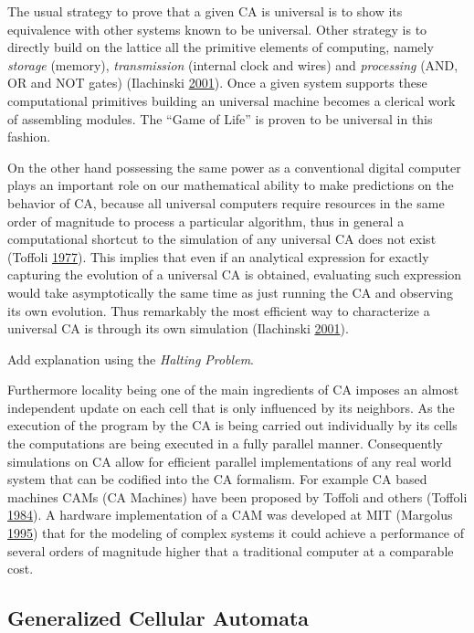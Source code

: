 \documentclass[
  openany]{book}
\begin{document}
The usual strategy to prove that a given CA is universal is to show its equivalence with other systems known to be universal. Other strategy is to directly build on the lattice all the primitive elements of computing, namely \emph{storage} (memory), \emph{transmission} (internal clock and wires) and \emph{processing} (AND, OR and NOT gates) (Ilachinski \protect\hyperlink{ref-ilachinski2001cellular}{2001}). Once a given system supports these computational primitives building an universal machine becomes a clerical work of assembling modules. The ``Game of Life'' is proven to be universal in this fashion.

On the other hand possessing the same power as a conventional digital computer plays an important role on our mathematical ability to make predictions on the behavior of CA, because all universal computers require resources in the same order of magnitude to process a particular algorithm, thus in general a computational shortcut to the simulation of any universal CA does not exist (Toffoli \protect\hyperlink{ref-toffoli1977cellular}{1977}). This implies that even if an analytical expression for exactly capturing the evolution of a universal CA is obtained, evaluating such expression would take asymptotically the same time as just running the CA and observing its own evolution. Thus remarkably the most efficient way to characterize a universal CA is through its own simulation (Ilachinski \protect\hyperlink{ref-ilachinski2001cellular}{2001}).

Add explanation using the \emph{Halting Problem}.

Furthermore locality being one of the main ingredients of CA imposes an almost independent update on each cell that is only influenced by its neighbors. As the execution of the program by the CA is being carried out individually by its cells the computations are being executed in a fully parallel manner. Consequently simulations on CA allow for efficient parallel implementations of any real world system that can be codified into the CA formalism. For example CA based machines CAMs (CA Machines) have been proposed by Toffoli and others (Toffoli \protect\hyperlink{ref-toffoli1984cam}{1984}). A hardware implementation of a CAM was developed at MIT (Margolus \protect\hyperlink{ref-margolus1995cam}{1995}) that for the modeling of complex systems it could achieve a performance of several orders of magnitude higher that a traditional computer at a comparable cost.

\hypertarget{generalized-cellular-automata}{%
\subsection{Generalized Cellular Automata}\label{generalized-cellular-automata}}
\end{document}
